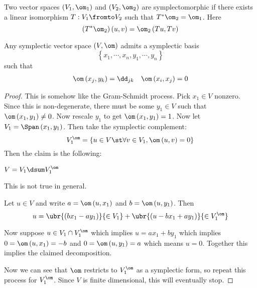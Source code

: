 \documentclass{amsart}
\begin{document}
\begin{exm}
Two vector spaces $\left( V_1 , \om_1 \right)$ and $\left( V_2 , \om_2 \right)$ are symplectomorphic if
there exists a linear isomorphism 
$T:V_1 \fromto V_2$ such that $T^* \om_2 = \om_1$.
Here
\begin{equation}
\left( T^* \om_2 \right) \left( u , v \right) = \om_2\left( Tu , Tv \right)
\end{equation}
\end{exm}

\begin{thm}
Any symplectic vector space $\left( V , \om  \right)$ admits a symplectic basis
\begin{equation}
\left\{ x_1 , \cdots , x_n , y_1 , \cdots , y_n \right\}
\end{equation} 
such that
\begin{align}
\om\left( x_j , y_k \right) = \dd_{jk}
&&
\om\left( x_i , x_j \right) = 0
\end{align}
\end{thm}

\begin{proof}
This is somehow like the Gram-Schmidt process.
Pick $x_1\in V$ nonzero. 
Since this is non-degenerate, there must be some $y_1\in V$ such that
$\om\left( x_1 , y_1 \right)\neq 0$. Now rescale $y_1$ to get $\om\left( x_1 , y_1 \right) = 1$.
Now let $V_1 = \Span\left( x_1 , y_1 \right)$. 
Then take the symplectic complement:
\begin{equation}
V_1^\om = 
\left\{ u\in V \st 
\forall v\in V_1,
\om\left( u , v \right) = 0 \right\}
\end{equation}
Then the claim is the following:
\begin{clm}
$V = V_1 \dsum V_1^\om$ 
\end{clm}
\begin{wrn}
This is not true in general.
\end{wrn}
Let $u\in V$ and write
$a = \om\left( u , x_1 \right)$ and
$b = \om\left( u , y_1 \right)$.
Then 
\begin{equation}
u = \ubr{\left( b x_1 - a y_1 \right)}{\in V_1} + 
\ubr{\left( u - b x_1 + a y_1 \right)}{\in V_1^\om}
\end{equation}

Now suppose $u\in V_1 \cap V_1^\om$ which implies $u = a x_1 + b y_1$
which implies $0 = \om\left( u , x_1 \right) = -b$
and $0 = \om\left( u , y_1 \right) = a$ which means $u = 0$.
Together this implies the claimed decomposition.

Now we can see that $\om$ restricts to 
$V_1^\om$ as a symplectic form, so repeat this process for $V_1^\om$. 
Since $V$ is finite dimensional, this will eventually stop.
\end{proof}
\end{document}
